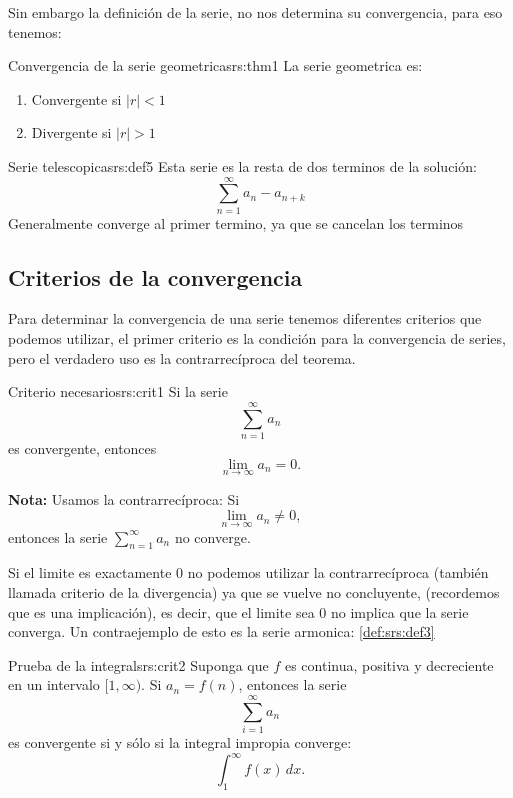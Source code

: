 Sin embargo la definición de la serie, no nos determina su convergencia, para eso tenemos:

\begin{teorema}{Convergencia de la serie geometrica}{srs:thm1}
    La serie geometrica es: 
    \begin{enumerate}
        \item Convergente si $|r| < 1$
        \item Divergente si $|r| > 1$
    \end{enumerate}
\end{teorema}

\begin{definicion}{Serie telescopica}{srs:def5}
    Esta serie es la resta de dos terminos de la solución:
    \[ 
        \sum_{n = 1}^{\infty} a_n - a_{n + k} 
    \]
    Generalmente converge al primer termino, ya que se cancelan los terminos
\end{definicion} 

\subsection{Criterios de la convergencia}
Para determinar la convergencia de una serie tenemos diferentes criterios que podemos utilizar, el primer criterio es la condición para la convergencia de series, pero el verdadero uso es la contrarrecíproca del teorema.
\begin{teorema}{Criterio necesario}{srs:crit1}
    Si la serie 
    \[
        \sum_{n=1}^{\infty} a_n
    \]
    es convergente, entonces 
    \[
        \lim_{n \to \infty} a_n = 0.
    \]

    \textbf{Nota:} Usamos la contrarrecíproca:  
    Si 
    \[
        \lim_{n \to \infty} a_n \neq 0,
    \]
    entonces la serie 
    \(\sum_{n=1}^{\infty} a_n\) no converge.
\end{teorema}

\begin{nota}
    Si el limite es exactamente $0$ no podemos utilizar la contrarrecíproca (también llamada criterio de la divergencia) ya que se vuelve no concluyente, (recordemos que es una implicación), es decir, que el limite sea $0$ no implica que la serie converga. Un contraejemplo de esto es la serie armonica: \ref{def:srs:def3}
\end{nota}

\begin{teorema}{Prueba de la integral}{srs:crit2}
    Suponga que $f$ es continua, positiva y decreciente en un intervalo $[1, \infty)$.  
    Si $a_n = f(n)$, entonces la serie
    \[
        \sum_{i=1}^{\infty} a_n
    \]
    es convergente si y sólo si la integral impropia converge:
    \[
        \int_{1}^{\infty} f(x)\,dx.
    \]
\end{teorema}

